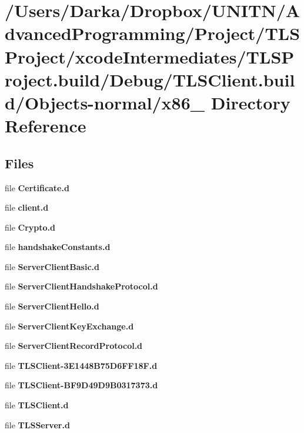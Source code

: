 \section{/\+Users/\+Darka/\+Dropbox/\+U\+N\+I\+T\+N/\+Advanced\+Programming/\+Project/\+T\+L\+S\+Project/xcode\+Intermediates/\+T\+L\+S\+Project.build/\+Debug/\+T\+L\+S\+Client.build/\+Objects-\/normal/x86\+\_ Directory Reference}
\label{dir_eab8caaad5a7ff523f9512b5ad54b0ef}
\subsection*{Files}
\begin{DoxyCompactItemize}
\item 
file {\bf Certificate.\+d}
\item 
file {\bf client.\+d}
\item 
file {\bf Crypto.\+d}
\item 
file {\bf handshake\+Constants.\+d}
\item 
file {\bf Server\+Client\+Basic.\+d}
\item 
file {\bf Server\+Client\+Handshake\+Protocol.\+d}
\item 
file {\bf Server\+Client\+Hello.\+d}
\item 
file {\bf Server\+Client\+Key\+Exchange.\+d}
\item 
file {\bf Server\+Client\+Record\+Protocol.\+d}
\item 
file {\bf T\+L\+S\+Client-\/3\+E1448\+B75\+D6\+F\+F18\+F.\+d}
\item 
file {\bf T\+L\+S\+Client-\/\+B\+F9\+D49\+D9\+B0317373.\+d}
\item 
file {\bf T\+L\+S\+Client.\+d}
\item 
file {\bf T\+L\+S\+Server.\+d}
\end{DoxyCompactItemize}
